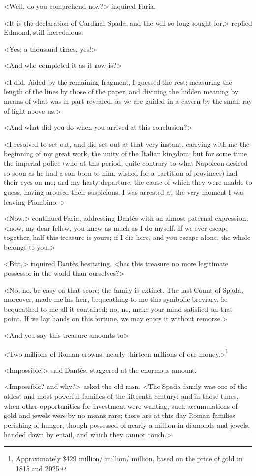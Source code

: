 <Well, do you comprehend now?> inquired Faria. 

 <It is the declaration of Cardinal Spada, and the will so long sought for,> replied Edmond, still incredulous. 

 <Yes; a thousand times, yes!> 

 <And who completed it as it now is?> 

 <I did. Aided by the remaining fragment, I guessed the rest; measuring the length of the lines by those of the paper, and divining the hidden meaning by means of what was in part revealed, as we are guided in a cavern by the small ray of light above us.> 

 <And what did you do when you arrived at this conclusion?> 

 <I resolved to set out, and did set out at that very instant, carrying with me the beginning of my great work, the unity of the Italian kingdom; but for some time the imperial police (who at this period, quite contrary to what Napoleon desired so soon as he had a son born to him, wished for a partition of provinces) had their eyes on me; and my hasty departure, the cause of which they were unable to guess, having aroused their suspicions, I was arrested at the very moment I was leaving Piombino. >

 <Now,> continued Faria, addressing Dantès with an almost paternal expression, <now, my dear fellow, you know as much as I do myself. If we ever escape together, half this treasure is yours; if I die here, and you escape alone, the whole belongs to you.> 

 <But,> inquired Dantès hesitating, <has this treasure no more legitimate possessor in the world than ourselves?> 

 <No, no, be easy on that score; the family is extinct. The last Count of Spada, moreover, made me his heir, bequeathing to me this symbolic breviary, he bequeathed to me all it contained; no, no, make your mind satisfied on that point. If we lay hands on this fortune, we may enjoy it without remorse.> 

 <And you say this treasure amounts to\longdash> 

 <Two millions of Roman crowns; nearly thirteen millions of our money.>\footnote{Approximately \$429 million/ million/ million, based on the price of gold in 1815 and 2025.} 

 <Impossible!> said Dantès, staggered at the enormous amount. 

 <Impossible? and why?> asked the old man. <The Spada family was one of the oldest and most powerful families of the fifteenth century; and in those times, when other opportunities for investment were wanting, such accumulations of gold and jewels were by no means rare; there are at this day Roman families perishing of hunger, though possessed of nearly a million in diamonds and jewels, handed down by entail, and which they cannot touch.> 

